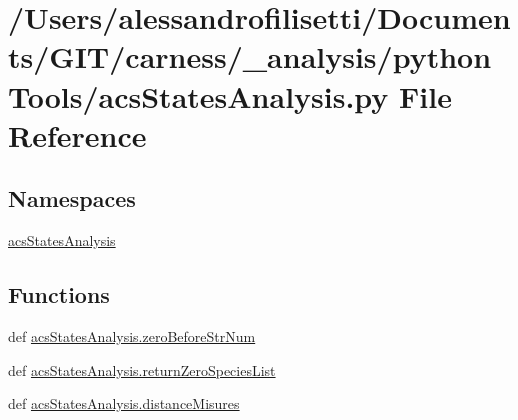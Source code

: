 \hypertarget{a00047}{\section{/\+Users/alessandrofilisetti/\+Documents/\+G\+I\+T/carness/\+\_\+analysis/python\+Tools/acs\+States\+Analysis.py File Reference}
\label{a00047}
}
\subsection*{Namespaces}
\begin{DoxyCompactItemize}
\item 
 \hyperlink{a00132}{acs\+States\+Analysis}
\end{DoxyCompactItemize}
\subsection*{Functions}
\begin{DoxyCompactItemize}
\item 
def \hyperlink{a00132_aeeb6d629132a9755b45a3008d445419c}{acs\+States\+Analysis.\+zero\+Before\+Str\+Num}
\item 
def \hyperlink{a00132_ad7c75c1e146fa51da42274cf7d5747d0}{acs\+States\+Analysis.\+return\+Zero\+Species\+List}
\item 
def \hyperlink{a00132_a76768d52780b1415a920dc94b3c991c0}{acs\+States\+Analysis.\+distance\+Misures}
\end{DoxyCompactItemize}
